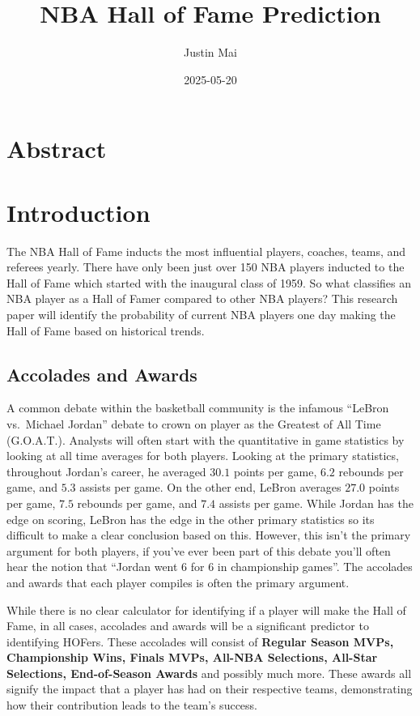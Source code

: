 \documentclass[
  11pt,
]{article}
\title{NBA Hall of Fame Prediction}
\author{Justin Mai}
\date{2025-05-20}
\begin{document}
\maketitle

{
\setcounter{tocdepth}{2}
\tableofcontents
}
\newpage

\section{Abstract}\label{abstract}

\newpage

\section{Introduction}\label{introduction}

The NBA Hall of Fame inducts the most influential players, coaches,
teams, and referees yearly. There have only been just over 150 NBA
players inducted to the Hall of Fame which started with the inaugural
class of 1959. So what classifies an NBA player as a Hall of Famer
compared to other NBA players? This research paper will identify the
probability of current NBA players one day making the Hall of Fame based
on historical trends.

\subsection{Accolades and Awards}\label{accolades-and-awards}

A common debate within the basketball community is the infamous ``LeBron
vs.~Michael Jordan'' debate to crown on player as the Greatest of All
Time (G.O.A.T.). Analysts will often start with the quantitative in game
statistics by looking at all time averages for both players. Looking at
the primary statistics, throughout Jordan's career, he averaged \(30.1\)
points per game, \(6.2\) rebounds per game, and \(5.3\) assists per
game. On the other end, LeBron averages \(27.0\) points per game,
\(7.5\) rebounds per game, and \(7.4\) assists per game. While Jordan
has the edge on scoring, LeBron has the edge in the other primary
statistics so its difficult to make a clear conclusion based on this.
However, this isn't the primary argument for both players, if you've
ever been part of this debate you'll often hear the notion that ``Jordan
went 6 for 6 in championship games''. The accolades and awards that each
player compiles is often the primary argument.

While there is no clear calculator for identifying if a player will make
the Hall of Fame, in all cases, accolades and awards will be a
significant predictor to identifying HOFers. These accolades will
consist of \textbf{Regular Season MVPs, Championship Wins, Finals MVPs,
All-NBA Selections, All-Star Selections, End-of-Season Awards} and
possibly much more. These awards all signify the impact that a player
has had on their respective teams, demonstrating how their contribution
leads to the team's success.
\end{document}
